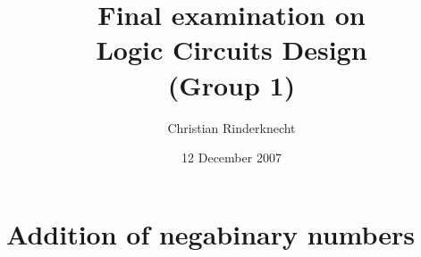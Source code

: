 \documentclass[11pt,a4paper]{article}
\title{Final examination on\\ Logic Circuits Design\\ (Group 1)}
\author{Christian Rinderknecht}
\date{12 December 2007}
\begin{document}
\maketitle
\thispagestyle{empty}

\allowdisplaybreaks

\section{Addition of negabinary numbers}


\end{document}
